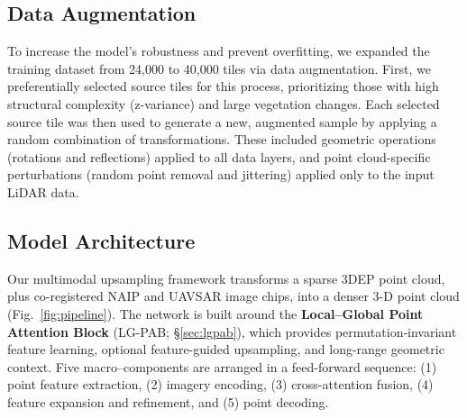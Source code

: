 \documentclass[remotesensing,article,submit,pdftex,moreauthors]{Definitions/mdpi}
\begin{document}
\subsection{Data Augmentation}
To increase the model's robustness and prevent overfitting, we expanded the training dataset from 24,000 to 40,000 tiles via data augmentation\cite{zhu2024advancements, shorten2019survey}. First, we preferentially selected source tiles for this process, prioritizing those with high structural complexity (z-variance) and large vegetation changes. Each selected source tile was then used to generate a new, augmented sample by applying a random combination of transformations. These included geometric operations (rotations and reflections) applied to all data layers, and point cloud-specific perturbations (random point removal and jittering) applied only to the input LiDAR data.


\subsection{Model Architecture}
\label{sec:architecture}
Our multimodal upsampling framework transforms a sparse 3DEP point cloud, plus co-registered NAIP and UAVSAR image chips, into a denser 3-D point cloud (Fig.~\ref{fig:pipeline}).  
The network is built around the \textbf{Local–Global Point Attention Block} (LG-PAB; §\ref{sec:lgpab}), which provides permutation‐invariant feature learning, optional feature-guided upsampling, and long-range geometric context.  
Five macro–components are arranged in a feed-forward sequence:  
(1) point feature extraction, (2) imagery encoding, (3) cross-attention fusion, (4) feature expansion and refinement, and (5) point decoding.
\end{document}
